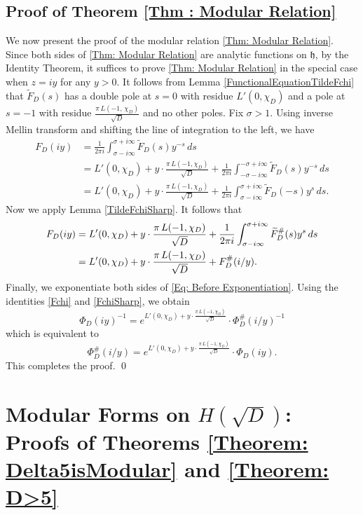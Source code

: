 \documentclass[11pt]{amsart}
\numberwithin{equation}{section}
\theoremstyle{remark}
\begin{document}
\subsection{Proof of Theorem \ref{Thm : Modular Relation}} \label{ProofMainTheorem}
We now present the proof of the modular relation \eqref{Thm: Modular Relation}. Since both sides of \eqref{Thm: Modular Relation} are analytic functions on $\mathfrak{h}$, by the Identity Theorem, it suffices to prove \eqref{Thm: Modular Relation} in the special case when $z=iy$ for any $y >0$. It follows from Lemma \ref{FunctionalEquationTildeFchi}
that $\widetilde{F}_{D}(s)$ has a double pole at $s=0$ with residue $L'(0,{\chi_{D}})$ and a pole at $s=-1$ with residue $\frac{\pi \,L(-1,\,{\chi_D})}{\sqrt{D}}$ and no other poles. Fix $\sigma > 1.$ Using inverse Mellin transform and shifting the line of integration to the left, we have
  \begin{align*}
  F_{D}(iy)  &= \frac{1}{2\pi i} \int_{\sigma-i\infty}^{\sigma+i\infty} \widetilde {F}_{D}(s)y^{-s} \, ds \\
  &= L'(0,{\chi_{D}}) +y\cdot\frac{\pi \, L(-1,{\chi_{D}})}{\sqrt{D}} + \frac{1}{2\pi i} \int_{-\sigma-i\infty}^{-\sigma+i\infty} \widetilde {F}_{D}(s)y^{-s} \, ds\\
  & =  L'(0,{\chi_{D}}) +y\cdot\frac{\pi \, L(-1,{\chi_{D}})}{\sqrt{D}}+ \frac{1}{2\pi i} \int_{\sigma-i\infty}^{\sigma+i\infty} \widetilde {F}_{D}(-s)y^{s} \, ds.
  \end{align*} 
  Now we apply Lemma \ref{TildeFchiSharp}. It follows that
\begin{align}\label{Eq: Before Exponentiation}
  F_{D}(iy) 
  & =  L'(0,{\chi_{D}}) +y\cdot\frac{\pi \, L(-1,{\chi_{D}})}{\sqrt{D}} +    \frac{1}{2\pi i} \int_{\sigma-i\infty}^{\sigma+i\infty}\widetilde{F}^\#_{D}(s)y^{s}\, ds \notag\\
  & = L'(0,{\chi_{D}}) +y\cdot\frac{\pi \, L(-1,{\chi_{D}})}{\sqrt{D}} + F_{D}^\#(i/y). 
  \end{align} 
Finally, we exponentiate both sides of \eqref{Eq: Before Exponentiation}. Using the identities \eqref{Fchi} and \eqref{FchiSharp}, we obtain
   $$\Phi_{D}(iy)^{-1} = e^{L'(0,{\chi_{D}})+y\cdot\frac{\pi \, L(-1,{\chi_D})}{\sqrt{D}}}\cdot \Phi_{D}^\#(i/y)^{-1}$$
   which is equivalent to
   $$\Phi_{D}^\#(i/y) = e^{L'(0,{\chi_{D}})+y\cdot\frac{\pi \, L(-1,{\chi_D})}{\sqrt{D}}}\cdot \Phi_{D}(iy).$$
This completes the proof. \qed

\section{Modular Forms on $H(\sqrt{D})$: Proofs of Theorems \ref{Theorem: Delta5isModular} and \ref{Theorem: D>5}}\label{sec: Proof of Modularity Theorems}
\end{document}
